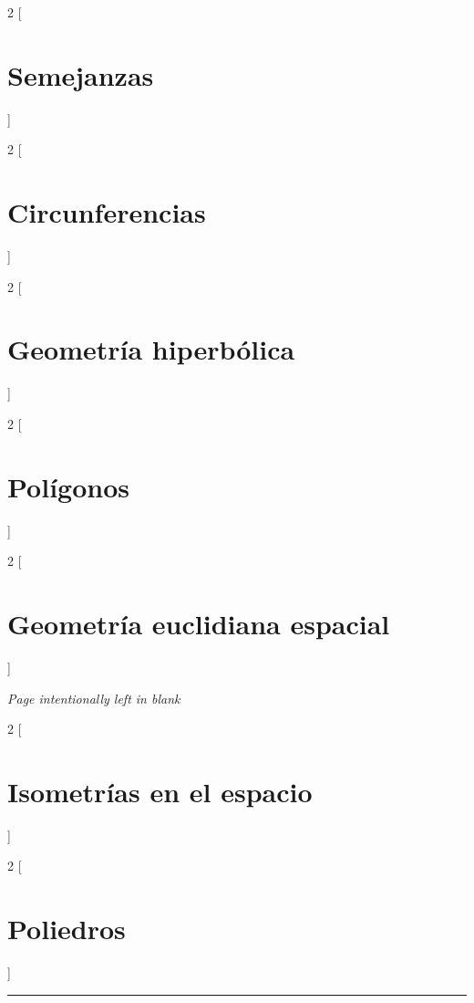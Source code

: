 \documentclass[a4paper, ]{article}
\begin{document}
	\begin{multicols*}{2}
	[\section{Semejanzas}]
	\end{multicols*}\pagebreak
	
	\begin{multicols*}{2}
	[\section{Circunferencias}]
	\end{multicols*}\pagebreak
	
	\begin{multicols*}{2}
	[\section{Geometría hiperbólica}]
	\end{multicols*}\pagebreak
	
	\begin{multicols*}{2}
	[\section{Polígonos}]
	\end{multicols*}\pagebreak
	
	\begin{multicols*}{2}
	[\section{Geometría euclidiana espacial}]
	\end{multicols*}\pagebreak
	
	\pagebreak
	\textcolor{gris}{\textit{Page intentionally left in blank}}
	\newpage
	\pagebreak
	
	\begin{multicols*}{2}
	[\section{Isometrías en el espacio}]
	\end{multicols*}\pagebreak
	
	\begin{multicols*}{2}
	[\section{Poliedros}]
	\end{multicols*}\pagebreak	
	 \noindent\rule{\linewidth}{0.4pt}
	 \doclicenseThis
	 
	 
	 
	 
	 
	 
	 
	 
	  	
 	
 	
 	
 	
 	
\end{document}
